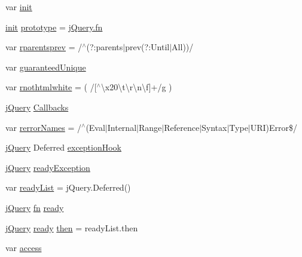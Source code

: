 \begin{DoxyCompactItemize}
\item 
var \hyperlink{jquery-3_82_81_8js_a8925a317299daf39d8500f1e56e5216b}{init}
\item 
\hyperlink{jquery-3_82_81_8js_a8925a317299daf39d8500f1e56e5216b}{init} \hyperlink{jquery-3_82_81_8js_ab5e5d0976552f788d31448ed049ae4a4}{prototype} = \hyperlink{jquery-3_82_81_8js_acef6bdaf6b9b20fdcca1ea86f0902c3b}{j\+Query.\+fn}
\item 
var \hyperlink{jquery-3_82_81_8js_a901301fe926fd08a05236505bcde40ac}{rparentsprev} = /$^\wedge$(?\+:parents$\vert$prev(?\+:Until$\vert$All))/
\item 
var \hyperlink{jquery-3_82_81_8js_a0b6c67c8bd08943b49b83df5a891cf5e}{guaranteed\+Unique}
\item 
var \hyperlink{jquery-3_82_81_8js_a143cc7657e391fda255ffff1cc6630b1}{rnothtmlwhite} = ( /\mbox{[}$^\wedge$\textbackslash{}x20\textbackslash{}t\textbackslash{}r\textbackslash{}n\textbackslash{}f\mbox{]}+/g )
\item 
\hyperlink{jquery-3_82_81_8js_a609525712f1102566c2b03866ceb2bba}{j\+Query} \hyperlink{jquery-3_82_81_8js_add8d59d25831bb9b171fdbee8a18795b}{Callbacks}
\item 
var \hyperlink{jquery-3_82_81_8js_a7c436c95688c6936f28388d5b3712ed0}{rerror\+Names} = /$^\wedge$(Eval$\vert$Internal$\vert$Range$\vert$Reference$\vert$Syntax$\vert$Type$\vert$U\+RI)Error\$/
\item 
\hyperlink{jquery-3_82_81_8js_a609525712f1102566c2b03866ceb2bba}{j\+Query} Deferred \hyperlink{jquery-3_82_81_8js_a0094c36c24cb568ce0da74328522ec43}{exception\+Hook}
\item 
\hyperlink{jquery-3_82_81_8js_a609525712f1102566c2b03866ceb2bba}{j\+Query} \hyperlink{jquery-3_82_81_8js_abe612c7bb71d321cd8404496c4ffd6bd}{ready\+Exception}
\item 
var \hyperlink{jquery-3_82_81_8js_a1ea568fbc6e7a700059e4becf41031f0}{ready\+List} = j\+Query.\+Deferred()
\item 
\hyperlink{jquery-3_82_81_8js_a609525712f1102566c2b03866ceb2bba}{j\+Query} \hyperlink{jquery-3_82_81_8js_acef6bdaf6b9b20fdcca1ea86f0902c3b}{fn} \hyperlink{jquery-3_82_81_8js_a1b01c09fc8c62ba97ab88b57672adaf4}{ready}
\item 
\hyperlink{jquery-3_82_81_8js_a609525712f1102566c2b03866ceb2bba}{j\+Query} \hyperlink{jquery-3_82_81_8js_a1b01c09fc8c62ba97ab88b57672adaf4}{ready} \hyperlink{jquery-3_82_81_8js_afa09a8b242de64df6b1163c06651f07f}{then} = ready\+List.\+then
\item 
var \hyperlink{jquery-3_82_81_8js_a4d22b5410118180ad16b385db5db0d0f}{access}

\end{DoxyCompactItemize}
